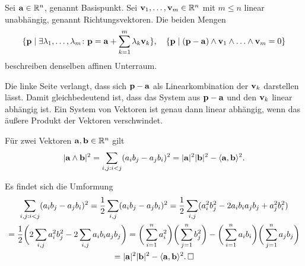 \begin{Satz}
Sei $\mathbf{a}\in\mathbb R^n$, genannt Basispunkt. Sei $\mathbf{v}_1,\dots,\mathbf{v}_m\in\mathbb R^n$
mit $m\le n$ linear unabhängig, genannt Richtungsvektoren. Die beiden Mengen
\[\{\mathbf{p}\mid\exists\lambda_1,\ldots, \lambda_m\colon \mathbf{p}
= \mathbf{a}+\sum_{k=1}^m \lambda_k\mathbf{v}_k\},\quad
\{\mathbf{p}\mid (\mathbf{p}-\mathbf{a})\wedge\mathbf{v}_1\wedge\ldots\wedge\mathbf{v}_m = 0\}\]
beschreiben denselben affinen Unterraum.
\end{Satz}
\begin{Beweis}
Die linke Seite verlangt, dass sich $\mathbf{p}-\mathbf{a}$ als Linearkombination
der $\mathbf{v}_k$ darstellen lässt. Damit gleichbedeutend ist, dass das
System aus $\mathbf{p}-\mathbf{a}$ und den $\mathbf{v}_k$ linear abhängig ist.
Ein System von Vektoren ist genau dann linear abhängig, wenn das
äußere Produkt der Vektoren verschwindet.\,\qedsymbol
\end{Beweis}

\begin{Satz}\newlinefirst
Für zwei Vektoren $\mathbf{a},\mathbf{b}\in\mathbb R^n$ gilt
\[|\mathbf{a}\wedge\mathbf{b}|^2 = \sum_{i,j:i<j}(a_i b_j - a_j b_i)^2 
= |\mathbf{a}|^2|\mathbf{b}|^2 - \langle\mathbf{a},\mathbf{b}\rangle^2.\]
\end{Satz}
\begin{Beweis}
Es findet sich die Umformung
\begin{gather*}
\sum_{i,j:i<j}(a_i b_j - a_j b_i)^2 = \frac{1}{2}\sum_{i,j}(a_i b_j - a_j b_i)^2
= \frac{1}{2}\sum_{i,j}(a_i^2 b_j^2 - 2a_i b_i a_j b_j + a_j^2 b_i^2)\\
= \frac{1}{2}\bigg(2\sum_{i,j} a_i^2 b_j^2 - 2\sum_{i,j}a_i b_i a_j b_j\bigg)
= \bigg(\sum_{i=1}^n a_i^2\bigg)\bigg(\sum_{j=1}^n b_j^2\bigg)
- \bigg(\sum_{i=1}^n a_i b_i\bigg)\bigg(\sum_{j=1}^n a_j b_j\bigg)\\
= |\mathbf{a}|^2 |\mathbf{b}|^2 - \langle\mathbf{a},\mathbf{b}\rangle^2.\,\square
\end{gather*}
\end{Beweis}

